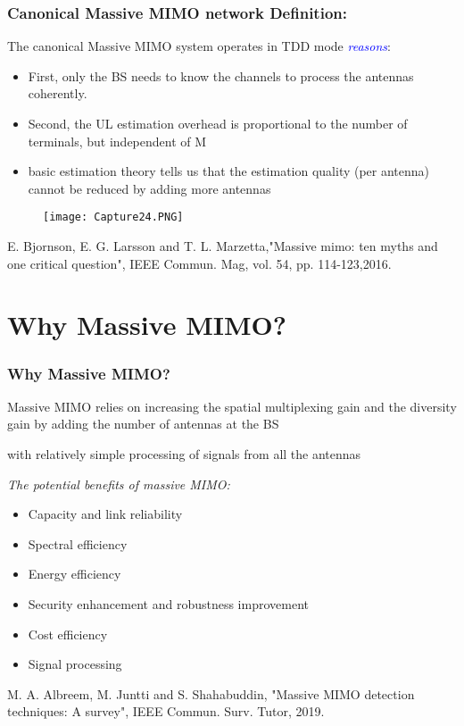 \documentclass{beamer}
\begin{document}
\begin{frame}[t,fragile=singleslide]\frametitle{Canonical Massive MIMO network Definition:}
The canonical Massive MIMO system operates in TDD mode %
\textcolor{blue}{\textit{reasons}}:
\begin{itemize}
\item First, only the BS needs to know the channels to process the antennas coherently.
\item Second, the UL estimation overhead is proportional to the number of terminals, but independent of M
\item basic estimation theory tells us that the estimation quality (per antenna) cannot be reduced by adding more antennas
\end{itemize}
\begin{figure}
  \texttt{[image: Capture24.PNG]}
\end{figure}
\tiny E. Bjornson, E. G. Larsson and T. L. Marzetta,"Massive mimo: ten myths and one critical question", IEEE Commun. Mag, vol. 54, pp. 114-123,2016.
\end{frame}


\section{Why Massive MIMO?}

\begin{frame}[fragile=singleslide]\frametitle{Why Massive MIMO?}

Massive MIMO relies on increasing the spatial multiplexing gain and the diversity gain by adding the number of antennas at the BS

with relatively simple processing of signals from all the antennas

\vspace{0.75cm}


\textit{The potential benefits of massive MIMO:}
\begin{itemize}
\item Capacity and link reliability
\item Spectral efficiency
\item Energy efficiency
\item Security enhancement and robustness improvement
\item Cost efficiency
\item Signal processing
\end{itemize}

\vspace{0.5cm}

\tiny M. A. Albreem, M. Juntti and S. Shahabuddin, "Massive MIMO detection techniques: A survey", IEEE Commun. Surv. Tutor, 2019.

\end{frame}
\end{document}
